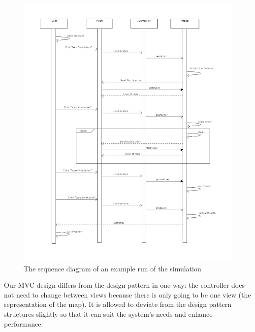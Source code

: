\documentclass{article}
\begin{document}
	\begin{figure}
		\vspace{-35pt}
		\centering
		\includegraphics[width=1.15\textwidth]{SequenceDiagram}
		\caption{The sequence diagram of an example run of the simulation}
		\label{SequenceDiagram}
	\end{figure}
	
	
	
	Our MVC design differs from the design pattern in one way: the controller does not need to change between views because there is only going to be one view (the representation of the map). 
	It is allowed to deviate from the design pattern structures slightly so that it can suit the system's needs and enhance performance. 
	
\end{document}
